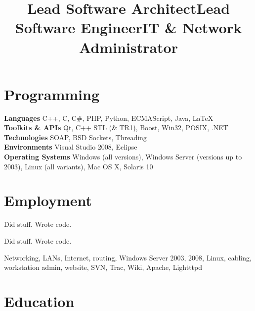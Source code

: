 \documentclass{resume}
\begin{document}
\address{22 Morse Close\\Chippenham\\SN15 3FY\\UK}
\address{lee@leegent.net\\+44 7748 183797}

\begin{resume}

\section{Programming} 

\textbf{Languages} C++, C, C\#, PHP, Python, ECMAScript, Java, LaTeX \\
\textbf{Toolkits \& APIs} Qt, C++ STL (\& TR1), Boost, Win32, POSIX, .NET \\
\textbf{Technologies} SOAP, BSD Sockets, Threading \\
\textbf{Environments} Visual Studio 2008, Eclipse \\
\textbf{Operating Systems} Windows (all versions), Windows Server (versions up to 2003), Linux (all variants), Mac OS X, Solaris 10

\section{Employment}

\title{Lead Software Architect}
\begin{position}
Did stuff.  Wrote code.
\end{position}

\title{Lead Software Engineer}
\begin{position}
Did stuff.  Wrote code.
\end{position}

\title{IT \& Network Administrator}
\begin{position}
Networking, LANs, Internet, routing, Windows Server 2003, 2008, Linux, cabling, workstation admin, website, SVN, Trac, Wiki, Apache, Lightttpd 
\end{position}

\section{Education}


\end{resume}
\end{document}
